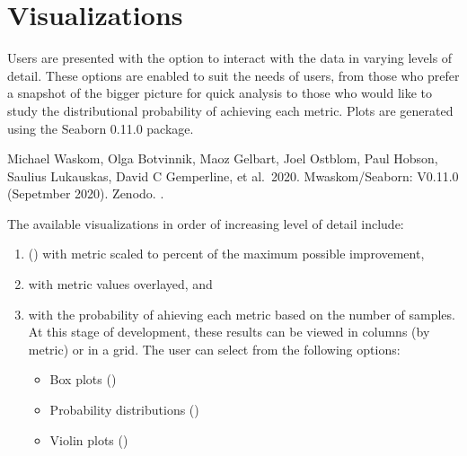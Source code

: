 \documentclass[letterpaper,10pt,english]{sphinxmanual}
\begin{document}
\section{Visualizations}
\label{\detokenize{user-interface:visualizations}}
Users are presented with the option to interact with the data in varying
levels of detail. These options are enabled to suit the needs of users,
from those who prefer a snapshot of the bigger picture for quick
analysis to those who would like to study the distributional probability
of achieving each metric. Plots are generated using the Seaborn 0.11.0
package. %
\begin{footnote}[1]\sphinxAtStartFootnote
Michael Waskom, Olga Botvinnik, Maoz Gelbart, Joel Ostblom, Paul
Hobson, Saulius Lukauskas, David C Gemperline, et al. 2020.
Mwaskom/Seaborn: V0.11.0 (Sepetmber 2020). Zenodo.
.
%
\end{footnote} The available visualizations in order of increasing level
of detail include:
\begin{enumerate}
\def\theenumi{\arabic{enumi}}
\def\labelenumi{\theenumi .}
\makeatletter\def\p@enumii{\p@enumi \theenumi .}\makeatother
\item {} 
 () with metric scaled to percent of the
maximum possible improvement,

\item {} 
 with metric values overlayed, and

\item {} 
 with the probability of ahieving each metric based
on the number of samples. At this stage of development, these results
can be viewed in columns (by metric) or in a grid. The user can
select from the following options:
\begin{itemize}
\item {} 
Box plots ()

\item {} 
Probability distributions ()

\item {} 
Violin plots ()

\end{itemize}

\end{enumerate}
\end{document}
